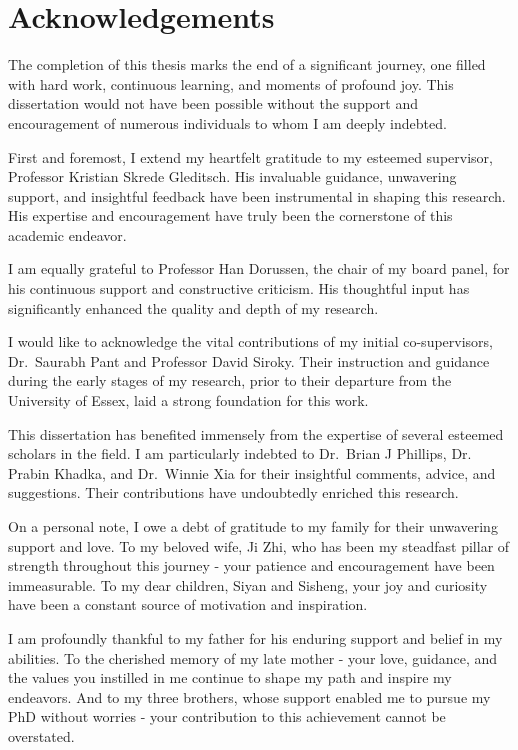 \documentclass[
  12pt,
]{report}
\renewcommand*\contentsname{Table of contents}
\newcommand\contentsname{Table of contents}
\begin{document}
\renewcommand*\contentsname{Contents}
{
\hypersetup{linkcolor=}
\setcounter{tocdepth}{2}
\tableofcontents
}
\listoffigures
\listoftables

\chapter*{Acknowledgements}\label{acknowledgements}

The completion of this thesis marks the end of a significant journey,
one filled with hard work, continuous learning, and moments of profound
joy. This dissertation would not have been possible without the support
and encouragement of numerous individuals to whom I am deeply indebted.

First and foremost, I extend my heartfelt gratitude to my esteemed
supervisor, Professor Kristian Skrede Gleditsch. His invaluable
guidance, unwavering support, and insightful feedback have been
instrumental in shaping this research. His expertise and encouragement
have truly been the cornerstone of this academic endeavor.

I am equally grateful to Professor Han Dorussen, the chair of my board
panel, for his continuous support and constructive criticism. His
thoughtful input has significantly enhanced the quality and depth of my
research.

I would like to acknowledge the vital contributions of my initial
co-supervisors, Dr.~Saurabh Pant and Professor David Siroky. Their
instruction and guidance during the early stages of my research, prior
to their departure from the University of Essex, laid a strong
foundation for this work.

This dissertation has benefited immensely from the expertise of several
esteemed scholars in the field. I am particularly indebted to Dr.~Brian
J Phillips, Dr. Prabin Khadka, and Dr.~Winnie Xia for their insightful
comments, advice, and suggestions. Their contributions have undoubtedly
enriched this research.

On a personal note, I owe a debt of gratitude to my family for their
unwavering support and love. To my beloved wife, Ji Zhi, who has been my
steadfast pillar of strength throughout this journey - your patience and
encouragement have been immeasurable. To my dear children, Siyan and
Sisheng, your joy and curiosity have been a constant source of
motivation and inspiration.

I am profoundly thankful to my father for his enduring support and
belief in my abilities. To the cherished memory of my late mother - your
love, guidance, and the values you instilled in me continue to shape my
path and inspire my endeavors. And to my three brothers, whose support
enabled me to pursue my PhD without worries - your contribution to this
achievement cannot be overstated.
\end{document}
